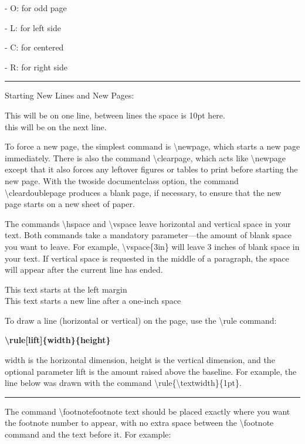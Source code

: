 \documentclass[a4paper,11pt,UTF8,openright]{book}
\begin{document}
- O: for odd page

- L: for left side

- C: for centered

- R: for right side

\vskip 0.05in
\rule{\textwidth}{0.5pt}
\vskip 0.05in

Starting New Lines and New Pages:

This will be on one line, between lines the space is 10pt here. \\[10pt] this will be on the next line. 

To force a new page, the simplest command is \textbackslash newpage, which starts a new page immediately. There is also the command \textbackslash clearpage, which acts like \textbackslash newpage except that it also forces any leftover figures or tables to print before starting the new page. With the twoside documentclass option, the command \textbackslash cleardoublepage produces a blank page, if necessary, to ensure that the new page starts on a new sheet of paper.

The commands \textbackslash hspace and \textbackslash vspace leave horizontal and vertical space in your text. Both commands take a mandatory parameter—the amount of blank space you want to leave. For example, \textbackslash vspace\{3in\} will leave 3 inches of blank space in your text. If vertical space is requested in the middle of a paragraph, the space will appear after the current line has ended.

This text starts at the left margin\\
\hspace*{1in}This text starts a new line after a one-inch space

To draw a line (horizontal or vertical) on the page, use the \textbackslash rule command:

\textbf{\textbackslash rule[lift]\{width\}\{height\}}

width is the horizontal dimension, height is the vertical dimension, and the optional
parameter lift is the amount raised above the baseline. For example, the line below was
drawn with the command \textbackslash rule\{\textbackslash textwidth\}\{1pt\}.

\rule{\textwidth}{1pt}

The command \textbackslash footnote{footnote text} should be placed exactly where you want the footnote number to appear, with no extra space between the \textbackslash footnote command and the text before it. For example: 
\end{document}
